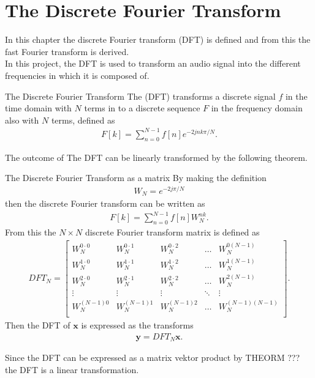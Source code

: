 \chapter{The Discrete Fourier Transform}
In this chapter the discrete Fourier transform (DFT) is defined and from this the fast Fourier transform is derived.\\

In this project, the DFT is used to transform an audio signal into the different frequencies in which it is composed of.

\begin{definition}{The Discrete Fourier Transform}
    The (DFT) transforms a discrete signal $f$ in the time domain with $N$ terms in to a discrete sequence $F$ in the frequency domain also with $N$ terms, defined as 
    \begin{align*}
        F[k]=\sum^{N-1}_{n=0}f[n]e^{-2jnk\pi/N}.
    \end{align*}
\end{definition}
The outcome of 
The DFT can be linearly transformed by the following theorem. 
\begin{theorem}{The Discrete Fourier Transform as a matrix}
    By making the definition 
    \begin{align*}
        W_N=e^{-2j\pi/N}
    \end{align*}
    then the discrete Fourier transform can be written as
    \begin{align*}
        F[k]=\sum^{N-1}_{n=0}f[n]W_N^{nk}.
    \end{align*}
    From this the $N\times N$ discrete Fourier transform matrix is defined as 
    \begin{align*}
        DFT_N=
        \begin{bmatrix}
             W_N^{0\cdot0} & W_N^{0\cdot1} & W_N^{0\cdot2} & \hdots & W_N^{0(N-1)} \\
             W_N^{1\cdot0} & W_N^{1\cdot1} & W_N^{1\cdot2} & \hdots & W_N^{1(N-1)} \\
             W_N^{2\cdot 0} & W_N^{2\cdot1} & W_N^{2\cdot2} & \hdots & W_N^{2(N-1)} \\
             \vdots & \vdots & \vdots & \ddots & \vdots \\
             W_N^{(N-1)0} & W_N^{(N-1)1} & W_N^{(N-1)2} & \hdots & W_N^{(N-1)(N-1)} \\
         \end{bmatrix}.
    \end{align*}
    Then the DFT of $\textbf{x}$ is expressed as the transforms
    \begin{align*}
        \textbf{y}=DFT_N\textbf{x}.
    \end{align*}
\end{theorem}
Since the DFT can be expressed as a matrix vektor product by THEORM ??? the DFT is a linear transformation.

